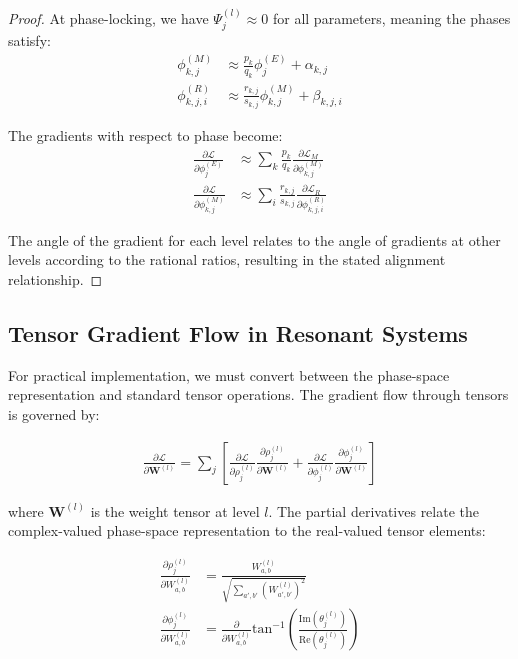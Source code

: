 \begin{proof}
At phase-locking, we have $\Psi^{(l)}_j \approx 0$ for all parameters, meaning the phases satisfy:
\begin{align}
\phi^{(M)}_{k,j} &\approx \frac{p_k}{q_k}\phi^{(E)}_{j} + \alpha_{k,j} \\
\phi^{(R)}_{k,j,i} &\approx \frac{r_{k,j}}{s_{k,j}}\phi^{(M)}_{k,j} + \beta_{k,j,i}
\end{align}

The gradients with respect to phase become:
\begin{align}
\frac{\partial \mathcal{L}}{\partial \phi^{(E)}_j} &\approx \sum_k \frac{p_k}{q_k}\frac{\partial \mathcal{L}_M}{\partial \phi^{(M)}_{k,j}} \\
\frac{\partial \mathcal{L}}{\partial \phi^{(M)}_{k,j}} &\approx \sum_i \frac{r_{k,j}}{s_{k,j}}\frac{\partial \mathcal{L}_R}{\partial \phi^{(R)}_{k,j,i}}
\end{align}

The angle of the gradient for each level relates to the angle of gradients at other levels according to the rational ratios, resulting in the stated alignment relationship.
\end{proof}

\subsection{Tensor Gradient Flow in Resonant Systems}

For practical implementation, we must convert between the phase-space representation and standard tensor operations. The gradient flow through tensors is governed by:

\begin{align}
\frac{\partial \mathcal{L}}{\partial \mathbf{W}^{(l)}} = \sum_j \left[\frac{\partial \mathcal{L}}{\partial \rho^{(l)}_j}\frac{\partial \rho^{(l)}_j}{\partial \mathbf{W}^{(l)}} + \frac{\partial \mathcal{L}}{\partial \phi^{(l)}_j}\frac{\partial \phi^{(l)}_j}{\partial \mathbf{W}^{(l)}}\right]
\end{align}

where $\mathbf{W}^{(l)}$ is the weight tensor at level $l$. The partial derivatives relate the complex-valued phase-space representation to the real-valued tensor elements:

\begin{align}
\frac{\partial \rho^{(l)}_j}{\partial W^{(l)}_{a,b}} &= \frac{W^{(l)}_{a,b}}{\sqrt{\sum_{a',b'} (W^{(l)}_{a',b'})^2}} \\
\frac{\partial \phi^{(l)}_j}{\partial W^{(l)}_{a,b}} &= \frac{\partial}{\partial W^{(l)}_{a,b}} \text{tan}^{-1}\left(\frac{\text{Im}(\theta^{(l)}_j)}{\text{Re}(\theta^{(l)}_j)}\right)
\end{align}

